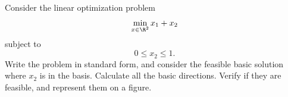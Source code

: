 

Consider the linear optimization problem
\[
\min_{x \in \R^2} x_1 + x_2
\]
subject to
\[
0 \leq x_2 \leq 1.
\]
Write the problem in standard form, and consider the feasible basic
solution where $x_2$ is in the basis. Calculate all the basic
directions. Verify if they are feasible, and represent them on a figure.


